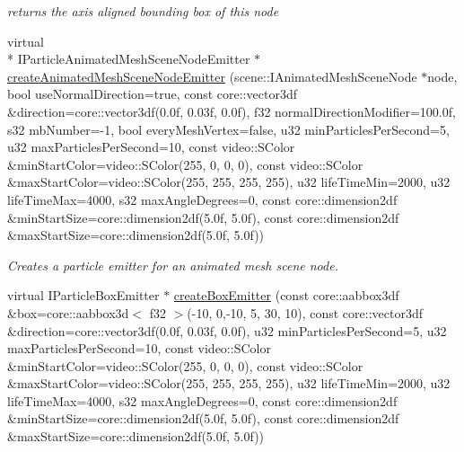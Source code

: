 \begin{DoxyCompactItemize}
\begin{DoxyCompactList}\small\item\em returns the axis aligned bounding box of this node \end{DoxyCompactList}\item 
\hypertarget{classirr_1_1scene_1_1_c_particle_system_scene_node_a15870486f3faef770bb987321791ffba}{virtual \\*
I\-Particle\-Animated\-Mesh\-Scene\-Node\-Emitter $\ast$ \hyperlink{classirr_1_1scene_1_1_c_particle_system_scene_node_a15870486f3faef770bb987321791ffba}{create\-Animated\-Mesh\-Scene\-Node\-Emitter} (scene\-::\-I\-Animated\-Mesh\-Scene\-Node $\ast$node, bool use\-Normal\-Direction=true, const core\-::vector3df \&direction=core\-::vector3df(0.\-0f, 0.\-03f, 0.\-0f), f32 normal\-Direction\-Modifier=100.\-0f, s32 mb\-Number=-\/1, bool every\-Mesh\-Vertex=false, u32 min\-Particles\-Per\-Second=5, u32 max\-Particles\-Per\-Second=10, const video\-::\-S\-Color \&min\-Start\-Color=video\-::\-S\-Color(255, 0, 0, 0), const video\-::\-S\-Color \&max\-Start\-Color=video\-::\-S\-Color(255, 255, 255, 255), u32 life\-Time\-Min=2000, u32 life\-Time\-Max=4000, s32 max\-Angle\-Degrees=0, const core\-::dimension2df \&min\-Start\-Size=core\-::dimension2df(5.\-0f, 5.\-0f), const core\-::dimension2df \&max\-Start\-Size=core\-::dimension2df(5.\-0f, 5.\-0f))}\label{classirr_1_1scene_1_1_c_particle_system_scene_node_a15870486f3faef770bb987321791ffba}

\begin{DoxyCompactList}\small\item\em Creates a particle emitter for an animated mesh scene node. \end{DoxyCompactList}\item 
\hypertarget{classirr_1_1scene_1_1_c_particle_system_scene_node_ad4bbed15c1135a31a989496c1e0ad04f}{virtual I\-Particle\-Box\-Emitter $\ast$ \hyperlink{classirr_1_1scene_1_1_c_particle_system_scene_node_ad4bbed15c1135a31a989496c1e0ad04f}{create\-Box\-Emitter} (const core\-::aabbox3df \&box=core\-::aabbox3d$<$ f32 $>$(-\/10, 0,-\/10, 5, 30, 10), const core\-::vector3df \&direction=core\-::vector3df(0.\-0f, 0.\-03f, 0.\-0f), u32 min\-Particles\-Per\-Second=5, u32 max\-Particles\-Per\-Second=10, const video\-::\-S\-Color \&min\-Start\-Color=video\-::\-S\-Color(255, 0, 0, 0), const video\-::\-S\-Color \&max\-Start\-Color=video\-::\-S\-Color(255, 255, 255, 255), u32 life\-Time\-Min=2000, u32 life\-Time\-Max=4000, s32 max\-Angle\-Degrees=0, const core\-::dimension2df \&min\-Start\-Size=core\-::dimension2df(5.\-0f, 5.\-0f), const core\-::dimension2df \&max\-Start\-Size=core\-::dimension2df(5.\-0f, 5.\-0f))}\label{classirr_1_1scene_1_1_c_particle_system_scene_node_ad4bbed15c1135a31a989496c1e0ad04f}


\end{DoxyCompactItemize}
